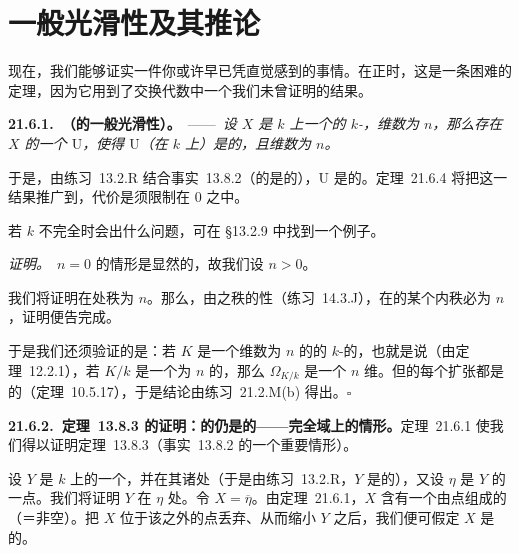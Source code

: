 
\section{一般光滑性及其推论}

现在，我们能够证实一件你或许早已凭直觉感到的事情。在正\trCharacteristic{}时，这是一条困难的定理，因为它用到了交换代数中一个我们未曾证明的结果。

\textbf{21.6.1.\ \trhTheorem（\trVariety{}的一般光滑性）。}\ ——\ \emph{设 $X$ 是\trPerfectField{} $k$ 上一个\trIntegral{}的\trFiniteType{} $k$-\trScheme，维数为 $n$，那么存在 $X$ 的一个\trDense\trOpenSubset{} $\mathrm{U}$，使得 $\mathrm{U}$（在 $k$ 上）是\trSmooth{}的，且维数为 $n$。}

于是，由\mbox{练习~13.2.R} 结合\mbox{事实~13.8.2}（\trRegular{}的\trLocalization{}是\trRegular{}的），$\mathrm{U}$ 是\trRegular{}的。\mbox{定理~21.6.4} 将把这一结果推广到\trSmooth\trMorphisms，代价是须限制在\trCharacteristic{} $0$ 之中。

若 $k$ 不完全时会出什么问题，可在 \S13.2.9 中找到一个例子。

\emph{证明。}\ $n=0$ 的情形是显然的，故我们设 $n>0$。

我们将证明在\trGenericPoint{}处秩为 $n$。那么，由\trCoherentSheaf{}之秩的\trUpperSemicontinuous{}性（\mbox{练习~14.3.J}），在\trGenericPoint{}的某个\trOpen\trNeighborhood{}内秩必为 $n$，证明便告完成。

于是我们还须验证的是：若 $K$ 是一个维数为 $n$ 的\trIntegral{}的\trFiniteType{} $k$-\trScheme{}的\trFractionField，也就是说（由\mbox{定理~12.2.1}），若 $K/k$ 是一个\trTrDeg{}为 $n$ 的\trFieldExtension，那么 $\Omega_{K/k}$ 是一个 $n$ 维\trVectorSpace。但\trPerfectField{}的每个\trFinitelyGenerated{}扩张都是\trSeparablyGenerated{}的（\mbox{定理~10.5.17}），于是结论由\mbox{练习~21.2.M(b)} 得出。\hfill$\square$

\textbf{21.6.2.\ \mbox{定理~13.8.3} 的证明：\trRegular\trLocalRing{}的\trLocalization{}仍是\trRegular{}的——完全域上\trVariety{}的情形。}\quad \mbox{定理~21.6.1} 使我们得以证明\mbox{定理~13.8.3}（\mbox{事实~13.8.2} 的一个重要情形）。

设 $Y$ 是\trPerfectField{} $k$ 上的一个\trVariety，并在其诸\trClosedPoint{}处\trRegular（于是由\mbox{练习~13.2.R}，$Y$ 是\trSmooth{}的），又设 $\eta$ 是 $Y$ 的一点。我们将证明 $Y$ 在 $\eta$ 处\trRegular。令 $X=\overline{\eta}$。由\mbox{定理~21.6.1}，$X$ 含有一个由\trSmooth{}点组成的\trDense{}（＝非空）\trOpenSubset。把 $X$ 位于该\trOpenSubset{}之外的点丢弃、从而缩小 $Y$ 之后，我们便可假定 $X$ 是\trSmooth{}的。

